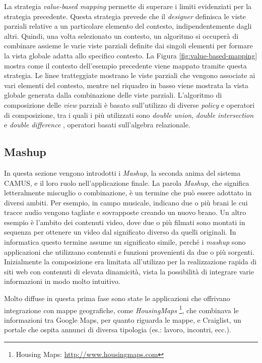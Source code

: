 La strategia \emph{value-based mapping} permette di superare i limiti evidenziati per la strategia precedente. Questa strategia prevede che il \emph{designer} definisca le viste parziali relative a un particolare elemento del contesto, indipendentemente dagli altri. Quindi, una volta selezionato un contesto, un algoritmo si occuperà di combinare assieme le varie viste parziali definite dai singoli elementi per formare la vista globale adatta allo specifico contesto. La Figura \ref{fig:value-based-mapping} mostra come il contesto dell'esempio precedente viene mappato tramite questa strategia. Le linee tratteggiate mostrano le viste parziali che vengono associate ai vari elementi del contesto, mentre nel riquadro in basso viene mostrata la vista globale generata dalla combinazione delle viste parziali. L'algoritmo di composizione delle \emph{view} parziali è basato sull'utilizzo di diverse \emph{policy} e operatori di composizione, tra i quali i più utilizzati sono \emph{double union}, \emph{double intersection} e \emph{double difference} \cite{DBLP:conf/er/BolchiniQR07}, operatori basati sull'algebra relazionale.

\subsection{Mashup\label{sec:mashup}}

In questa sezione vengono introdotti i \emph{Mashup}, la seconda anima del sistema CAMUS, e il loro ruolo nell'applicazione finale.
La parola \emph{Mashup}, che significa letteralmente miscuglio o combinazione, è un termine che può essere adottato in diversi ambiti.
Per esempio, in campo musicale, indicano due o più brani le cui tracce audio vengono tagliate e sovrapposte creando un nuovo brano. Un altro esempio è l'ambito dei contenuti video, dove due o più filmati sono montati in sequenza per ottenere un video dal significato diverso da quelli originali.
In informatica questo termine assume un significato simile, perché i \emph{mashup} sono applicazioni che utilizzano contenuti e funzioni provenienti da due o più sorgenti\cite{DBLP:books/sp/DanielM14}.
Inizialmente la composizione era limitata all'utilizzo per la realizzazione rapida di siti web con contenuti di elevata dinamicità, vista la possibilità di integrare varie informazioni in modo molto intuitivo.

Molto diffuse in questa prima fase sono state le applicazioni che offrivano integrazione con mappe geografiche, come \emph{HousingMaps} \footnote{Housing Maps: \url{http://www.housingmaps.com}}, che combinava le informazioni tra Google Maps, per quanto riguarda le mappe, e Craiglist, un portale che ospita annunci di diversa tipologia (es.: lavoro, incontri, ecc.).

